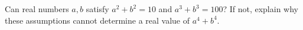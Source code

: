 Can real numbers $a,b$ satisfy $a^2+b^2=10$ and $a^3+b^3=100$? If not, explain why these assumptions cannot determine a real value of $a^4+b^4$.
